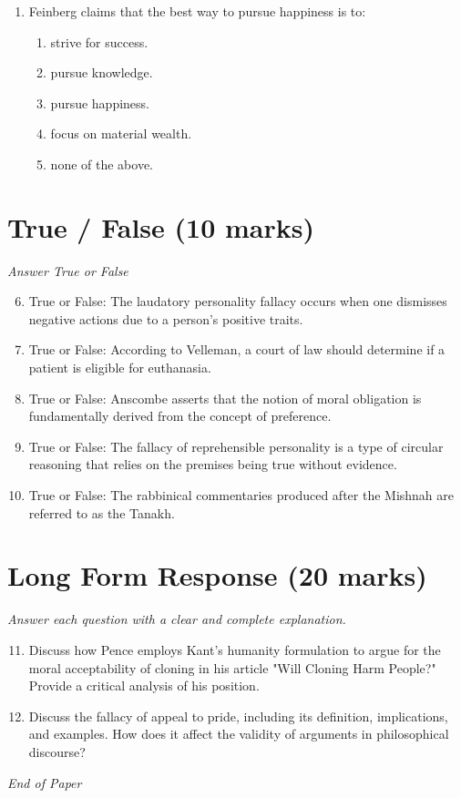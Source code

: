 \documentclass[12pt]{article}
\begin{document}
\begin{enumerate}[label=\arabic*.]
\begin{enumerate}[label=(\alph*)]
    \item merchants who sell harmful products.
    \item war profiteers exploiting conflict.
\end{enumerate}
\item Feinberg claims that the best way to pursue happiness is to:
\begin{enumerate}[label=(\alph*)]
    \item strive for success.
    \item pursue knowledge.
    \item pursue happiness.
    \item focus on material wealth.
    \item none of the above.
\end{enumerate}
\end{enumerate}

\section*{True / False (10 marks)}
\textit{Answer True or False}
\begin{enumerate}[label=\arabic*.]
\setcounter{enumi}{5}
\item True or False: The laudatory personality fallacy occurs when one dismisses negative actions due to a person's positive traits.
\item True or False: According to Velleman, a court of law should determine if a patient is eligible for euthanasia.
\item True or False: Anscombe asserts that the notion of moral obligation is fundamentally derived from the concept of preference.
\item True or False: The fallacy of reprehensible personality is a type of circular reasoning that relies on the premises being true without evidence.
\item True or False: The rabbinical commentaries produced after the Mishnah are referred to as the Tanakh.
\end{enumerate}

\section*{Long Form Response (20 marks)}
\textit{Answer each question with a clear and complete explanation.}
\begin{enumerate}[label=\arabic*.]
\setcounter{enumi}{10}
\item Discuss how Pence employs Kant's humanity formulation to argue for the moral acceptability of cloning in his article "Will Cloning Harm People?" Provide a critical analysis of his position.
\item Discuss the fallacy of appeal to pride, including its definition, implications, and examples. How does it affect the validity of arguments in philosophical discourse?
\end{enumerate}

\vfill
\noindent\textit{End of Paper}
\end{document}
